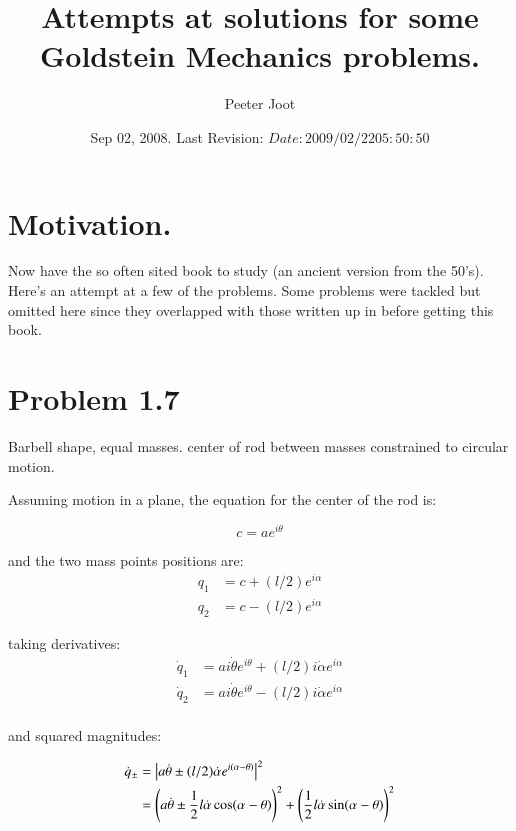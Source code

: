\documentclass{article}
\title{Attempts at solutions for some Goldstein Mechanics problems.}
\author{Peeter Joot}
\date{ Sep 02, 2008.  Last Revision: $Date: 2009/02/22 05:50:50 $ }
\newcommand{\Abs}[1]{\left\lvert{#1}\right\rvert}
\newcommand{\qdot}[0]{\dot{q}}
\newcommand{\dotalpha}[0]{\dot{\alpha}}
\newcommand{\dottheta}[0]{\dot{\theta}}
\begin{document}
             

\maketitle{}

\section{ Motivation. }

Now have the so often sited \cite{goldstein1951cm} book to study (an ancient
version from the 50's).  Here's an attempt at a few of the problems.  Some
problems were tackled but omitted here since they overlapped with those written up in
\cite{PJTongMf1} before getting this book.

\section{ Problem 1.7 }

Barbell shape, equal masses.  center of rod between masses constrained to circular motion.

Assuming motion in a plane, the equation for the center of the rod is:

\begin{equation*}
c = a e^{i\theta}
\end{equation*}

and the two mass points positions are:
\begin{align*}
q_1 &= c + (l/2) e^{i\alpha} \\
q_2 &= c - (l/2) e^{i\alpha}
\end{align*}

taking derivatives:
\begin{align*}
\qdot_1 &= a i \dottheta e^{i\theta} + (l/2) i \dotalpha e^{i\alpha} \\
\qdot_2 &= a i \dottheta e^{i\theta} - (l/2) i \dotalpha e^{i\alpha} \\
\end{align*}

and squared magnitudes:

\begin{align*}
\qdot_{\pm}
&= \Abs{a \dottheta \pm (l/2) \dotalpha e^{i(\alpha - \theta)}}^2 \\
&= \left(a \dottheta   \pm   \inv{2} l \dotalpha \cos(\alpha - \theta)\right)^2 + \left(\inv{2} l \dotalpha \sin(\alpha - \theta)\right)^2
\end{align*}
\end{document}
